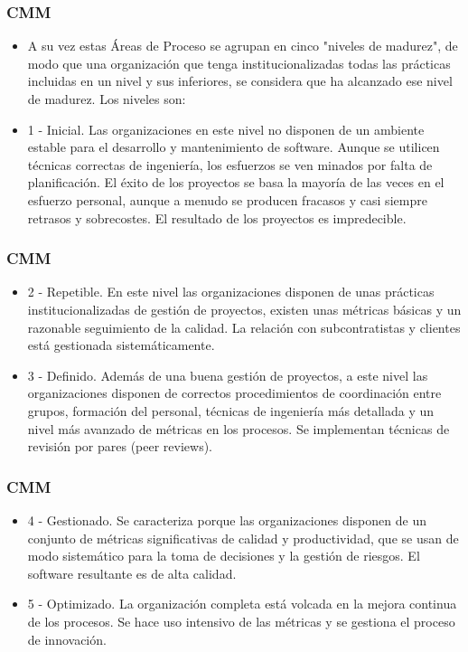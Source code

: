\documentclass{beamer}
\begin{document}
\frame
{
  \frametitle{CMM}
  \begin{itemize}
    \item<1-> A su vez estas Áreas de Proceso se agrupan en cinco "niveles de madurez", de modo que una organización que tenga institucionalizadas todas las prácticas incluidas en un nivel y sus inferiores, se considera que ha alcanzado ese nivel de madurez. Los niveles son:
    \item<2-> {\Large 1 - Inicial.} Las organizaciones en este nivel no disponen de un ambiente estable para el desarrollo y mantenimiento de software. Aunque se utilicen técnicas correctas de ingeniería, los esfuerzos se ven minados por falta de planificación. El éxito de los proyectos se basa la mayoría de las veces en el esfuerzo personal, aunque a menudo se producen fracasos y casi siempre retrasos y sobrecostes. El resultado de los proyectos es impredecible. 
  \end{itemize}
}

\frame
{
  \frametitle{CMM}
  \begin{itemize}
    \item<1->{\Large  2 - Repetible.} En este nivel las organizaciones disponen de unas prácticas institucionalizadas de gestión de proyectos, existen unas métricas básicas y un razonable seguimiento de la calidad. La relación con subcontratistas y clientes está gestionada sistemáticamente.

    \item<2-> {\Large 3 - Definido.} Además de una buena gestión de proyectos, a este nivel las organizaciones disponen de correctos procedimientos de coordinación entre grupos, formación del personal, técnicas de ingeniería más detallada y un nivel más avanzado de métricas en los procesos. Se implementan técnicas de revisión por pares (peer reviews).
  \end{itemize}
}

\frame
{
	\frametitle{CMM}
	\begin{itemize}
	    \item<1-> {\Large 4 - Gestionado.} Se caracteriza porque las organizaciones disponen de un conjunto de métricas significativas de calidad y productividad, que se usan de modo sistemático para la toma de decisiones y la gestión de riesgos. El software resultante es de alta calidad.

    	\item<2->{\Large  5 - Optimizado.} La organización completa está volcada en la mejora continua de los procesos. Se hace uso intensivo de las métricas y se gestiona el proceso de innovación.
	\end{itemize}
}
\end{document}
